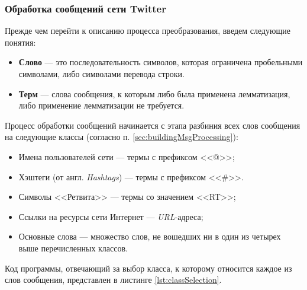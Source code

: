     \subsubsection{Обработка сообщений сети Twitter}
    Прежде чем перейти к описанию процесса преобразования, введем следующие
    понятия:
    \begin{itemize}
        \item {\bf Слово} --- это последовательность символов, которая ограничена
            пробельными символами, либо символами перевода строки.
        \item {\bf Терм} --- слова сообщения, к которым либо была применена
            лемматизация, либо применение лемматизации не требуется.
    \end{itemize}


    Процесс обработки сообщений начинается с этапа разбиния всех слов сообщения
    на следующие классы (согласно п. \ref{sec:buildingMsgProcessing}):
    \begin{itemize}
        \item Имена пользователей сети \twitter --- термы с префиксом <<@>>;
        \item Хэштеги (от англ. {\it Hashtags}) --- термы с префиксом <<\#>>.
        \item Символы <<Ретвита>> --- термы со значением <<RT>>;
        \item Ссылки на ресурсы сети Интернет --- {\it URL\hspace{1pt}}-адреса;
        \item Основные слова --- множество слов, не вошедших ни в один из четырех
            выше перечисленных классов.
    \end{itemize}

    Код программы, отвечающий за выбор класса, к которому относится каждое из
    слов сообщения, представлен в листинге \ref{lst:classSelection}.

    \lstset{style=python}
    

